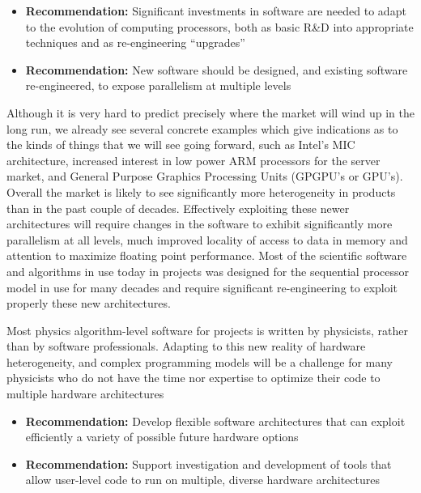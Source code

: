 \begin{itemize}
\item[] {\bf Recommendation:} Significant investments in software
are needed to adapt to the evolution of computing processors, both
as basic R\&D into appropriate techniques and as re-engineering
``upgrades''
\item[] {\bf Recommendation:} New software should be designed, and 
existing software re-engineered, to expose parallelism at multiple levels
\end{itemize}


Although it is very hard to predict precisely where the market will wind up
in the long run, we already see several concrete examples which give
indications as to the kinds of things that we will see going forward, such
as Intel's MIC architecture, increased interest in low power ARM processors
for the server market, and General Purpose Graphics Processing Units 
(GPGPU's or GPU's). Overall the market is likely to see significantly more 
heterogeneity in products than in the past couple of decades. Effectively 
exploiting these newer architectures will require changes in the software
to exhibit significantly more parallelism at all levels, much improved locality
of access to data in memory and attention to maximize floating point
performance. Most of the scientific software and algorithms
in use today in projects was designed for the sequential processor
model in use for many decades and require significant re-engineering to 
exploit properly these new architectures.

Most physics algorithm-level software for projects is written by
physicists, rather than by software professionals. Adapting to this new
reality of hardware heterogeneity, and complex programming models will
be a challenge for many physicists who do not have the time nor
expertise to optimize their code to multiple hardware architectures

\begin{itemize}
\item[] {\bf Recommendation:} Develop flexible software architectures that can exploit efficiently a variety of possible future hardware options
\item[] {\bf Recommendation:} Support investigation and development of tools that allow user-level code to run on multiple, diverse hardware architectures
\end{itemize}

